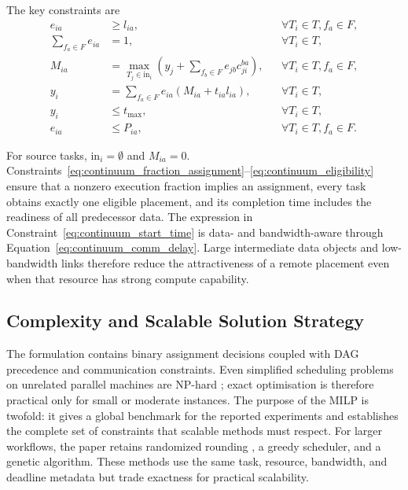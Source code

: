 The key constraints are
\begin{align}
 e_{ia} &\geq l_{ia}, &&\forall T_i\in T, f_a\in F, \label{eq:continuum_fraction_assignment}\\
 \sum_{f_a\in F}e_{ia} &=1, &&\forall T_i\in T, \label{eq:continuum_one_assignment}\\
 M_{ia} &=\max_{T_j\in\mathrm{in}_i}\left(y_j+\sum_{f_b\in F} e_{jb}c_{ji}^{ba}\right), &&\forall T_i\in T, f_a\in F, \label{eq:continuum_start_time}\\
 y_i &=\sum_{f_a\in F}e_{ia}\left(M_{ia}+t_{ia}l_{ia}\right), &&\forall T_i\in T, \label{eq:continuum_completion_time}\\
 y_i &\leq t_{\max}, &&\forall T_i\in T, \label{eq:continuum_deadline}\\
 e_{ia} &\leq P_{ia}, &&\forall T_i\in T, f_a\in F. \label{eq:continuum_eligibility}
\end{align}

For source tasks, $\mathrm{in}_i=\emptyset$ and $M_{ia}=0$. Constraints~\ref{eq:continuum_fraction_assignment}--\ref{eq:continuum_eligibility} ensure that a nonzero execution fraction implies an assignment, every task obtains exactly one eligible placement, and its completion time includes the readiness of all predecessor data. The expression in Constraint~\ref{eq:continuum_start_time} is data- and bandwidth-aware through Equation~\ref{eq:continuum_comm_delay}. Large intermediate data objects and low-bandwidth links therefore reduce the attractiveness of a remote placement even when that resource has strong compute capability.

\subsection{Complexity and Scalable Solution Strategy}

The formulation contains binary assignment decisions coupled with DAG precedence and communication constraints. Even simplified scheduling problems on unrelated parallel machines are NP-hard \cite{lenstra1990approximation}; exact optimisation is therefore practical only for small or moderate instances. The purpose of the MILP is twofold: it gives a global benchmark for the reported experiments and establishes the complete set of constraints that scalable methods must respect. For larger workflows, the paper retains randomized rounding \cite{raghavan1987randomized}, a greedy scheduler, and a genetic algorithm. These methods use the same task, resource, bandwidth, and deadline metadata but trade exactness for practical scalability.

